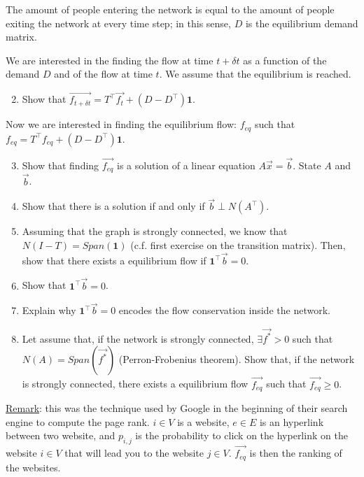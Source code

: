 The amount of people entering the network is equal to the amount of people exiting the network at every time step; in this sense, $D$ is the equilibrium demand matrix.


We are interested in the finding the flow at time $t+\delta t$ as a function of the demand $D$ and of the flow at time $t$.
We assume that the equilibrium is reached. 

\begin{enumerate}
\setcounter{enumi}{1}
\item Show that $\vec{f_{t+\delta t}} = T^\top \vec{f_t} + (D - D^\top) \mathbf{1}$.

\sol{}
\end{enumerate}

Now we are interested in finding the equilibrium flow: $f_{eq}$ such that $f_{eq} = T^\top f_{eq} + (D - D^\top) \mathbf{1}$.

\begin{enumerate}
\setcounter{enumi}{2}
\item Show that finding $\vec{f_{eq}}$ is a solution of a linear equation $A\vec{x}=\vec{b}$. State $A$ and $\vec{b}$.

\sol{}
\item Show that there is a solution if and only if $\vec{b}\perp N(A^\top)$.

\sol{}
\item Assuming that the graph is strongly connected, we know that $N(I-T)=Span(\textbf{1})$ (c.f. first exercise on the transition matrix). Then, show that there exists a equilibrium flow if $\mathbf{1}^\top \vec{b} = 0$.

\sol{}
\item Show that $\mathbf{1}^\top \vec{b} = 0$.

\sol{}
\item Explain why $\mathbf{1}^\top \vec{b} = 0$ encodes the flow conservation inside the network.

\sol{}
\item Let assume that, if the network is strongly connected, $\exists \vec{f^*} > 0$ such that $N(A)=Span(\vec{f^*})$ (Perron-Frobenius theorem). Show that, if the network is strongly connected, there exists a equilibrium flow $\vec{f_{eq}}$ such that $\vec{f_{eq}}\geq 0$.

\sol{}
\end{enumerate}
\underline{Remark}: this was the technique used by Google in the beginning of their search engine to compute the page rank. $i\in V$ is a website, $e\in E$ is an hyperlink between two website, and $p_{i,j}$ is the probability to click on the hyperlink on the website $i\in V$ that will lead you to the website $j\in V$. $\vec{f_{eq}}$ is then the ranking of the websites. 

